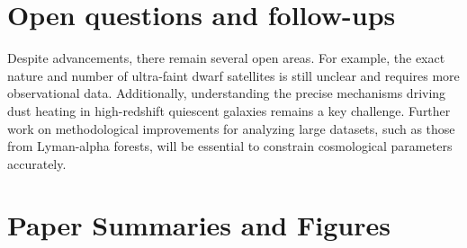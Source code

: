 \documentclass[11pt]{article}
\begin{document}
\section*{Open questions and follow-ups}
Despite advancements, there remain several open areas. For example, the exact nature and number of ultra-faint dwarf satellites is still unclear and requires more observational data. Additionally, understanding the precise mechanisms driving dust heating in high-redshift quiescent galaxies remains a key challenge. Further work on methodological improvements for analyzing large datasets, such as those from Lyman-alpha forests, will be essential to constrain cosmological parameters accurately.
\newpage
\section*{Paper Summaries and Figures}
\end{document}
